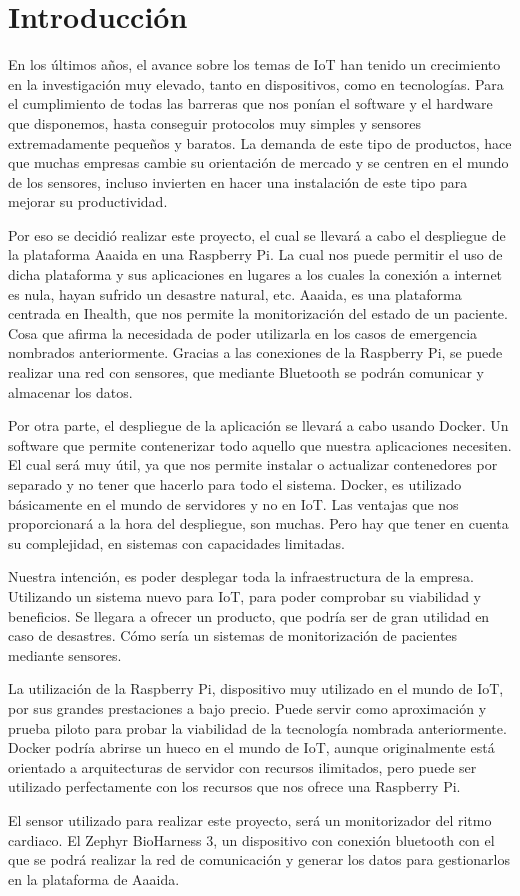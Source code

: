 \cleardoublepage
{}
\chapter*{Introducción}

En los últimos años, el avance sobre los temas de IoT han tenido un crecimiento en la investigación muy elevado, tanto en dispositivos, como en tecnologías. Para el cumplimiento de todas las barreras que nos ponían el software y el hardware que disponemos, hasta conseguir protocolos muy simples y sensores extremadamente pequeños y baratos. La demanda de este tipo de productos, hace que muchas empresas cambie su orientación de mercado y se centren en el mundo de los sensores,  incluso invierten en hacer una instalación de este tipo para mejorar su productividad. 

Por eso se decidió realizar este proyecto, el cual se llevará a cabo el despliegue de la plataforma Aaaida en una Raspberry Pi. La cual nos puede permitir el uso de dicha plataforma y sus aplicaciones en lugares a los cuales la conexión a internet es nula, hayan sufrido un desastre natural, etc.  Aaaida, es una plataforma centrada en Ihealth, que nos permite la monitorización del estado de un paciente. Cosa que afirma la necesidada de poder utilizarla en los casos de emergencia nombrados anteriormente.
Gracias a las conexiones de la Raspberry Pi, se puede realizar una red con sensores, que mediante Bluetooth se podrán comunicar y almacenar los datos. 

Por otra parte, el despliegue de la aplicación se llevará a cabo usando Docker. Un software que permite contenerizar todo aquello que nuestra aplicaciones necesiten. El cual será muy útil, ya que nos permite instalar o actualizar contenedores por separado y no tener que hacerlo para todo el sistema. Docker, es utilizado básicamente en el mundo de servidores y no en IoT. Las ventajas que nos proporcionará a la hora del despliegue, son muchas. Pero hay que tener en cuenta su complejidad, en sistemas con capacidades limitadas.

Nuestra intención, es poder desplegar toda la infraestructura de la empresa. Utilizando un sistema nuevo para IoT, para poder comprobar su viabilidad y beneficios. Se llegara a ofrecer un producto, que podría ser de gran utilidad en caso de desastres. Cómo sería un sistemas de monitorización de pacientes mediante sensores. 

La utilización de la Raspberry Pi, dispositivo muy utilizado en el mundo de IoT, por sus grandes prestaciones a bajo precio. Puede servir como aproximación y prueba piloto para  probar la viabilidad de la tecnología nombrada anteriormente. Docker podría abrirse un hueco en el mundo de IoT, aunque originalmente está orientado a arquitecturas de servidor con recursos ilimitados, pero puede ser utilizado perfectamente con los recursos que nos ofrece una Raspberry Pi. 

El sensor utilizado para realizar este proyecto, será un monitorizador del ritmo cardiaco. 
El Zephyr BioHarness 3, un dispositivo con conexión bluetooth con el que se podrá realizar la red de comunicación y generar los datos para gestionarlos en la plataforma de Aaaida. 